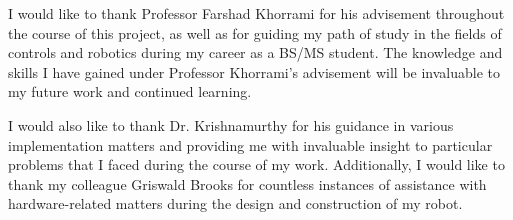 \clearpage
\vspace*{\fill}
	\begin{center}
		\begin{minipage}{\textwidth}
			\hspace{5mm} 
			I would like to thank Professor Farshad Khorrami for his advisement throughout the course of this project, as well as for guiding my path of study in the fields of controls and robotics during my career as a BS/MS student. The knowledge and skills I have gained under Professor Khorrami's advisement will be invaluable to my future work and continued learning. %
			
			\vspace{5mm}
			\hspace{5mm} 
			I would also like to thank Dr. Krishnamurthy for his guidance in various implementation matters and providing me with invaluable insight to particular problems that I faced during the course of my work. Additionally, I would like to thank my colleague Griswald Brooks for countless instances of assistance with hardware-related matters during the design and construction of my robot. 
		\end{minipage}
	\end{center}
\vfill %
\clearpage
